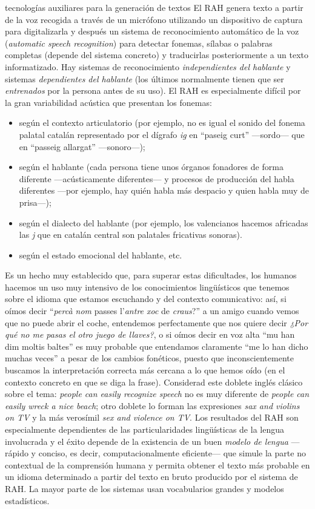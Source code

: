 \begin{persabermes}{tecnologías auxiliares para la generación de textos}
El RAH genera texto a partir de la voz recogida a través de un micrófono utilizando un dispositivo de captura para digitalizarla y después un sistema de reconocimiento automático de la voz (\emph{automatic speech recognition}) para detectar fonemas, sílabas o palabras completas (depende del sistema concreto) y traducirlas posteriormente a un texto informatizado. Hay sistemas de reconocimiento {\em independientes del hablante} y sistemas \emph{dependientes del hablante} (los últimos normalmente tienen que ser \emph{entrenados} por la persona antes de su uso). El RAH es especialmente difícil por la gran variabilidad acústica que presentan los fonemas: \begin{itemize} \item según el contexto articulatorio (por ejemplo, no es igual el sonido del fonema palatal catalán representado por el dígrafo \emph{ig} en ``paseig curt'' ---sordo--- que en ``passeig allargat'' ---sonoro---); \item según el hablante (cada persona tiene unos órganos fonadores de forma diferente ---acústicamente diferentes--- y procesos de producción del habla diferentes ---por ejemplo, hay quién habla más despacio y quien habla muy de prisa---); \item según el dialecto del hablante (por ejemplo, los valencianos hacemos africadas las \emph{j} que en catalán central son palatales fricativas sonoras). \item según el estado emocional del hablante, etc. \end{itemize} Es un hecho muy establecido que, para superar estas dificultades, los humanos hacemos un uso muy intensivo de los conocimientos lingüísticos que tenemos sobre el idioma que estamos escuchando y del contexto comunicativo: así, si oímos decir ``\emph{percà nom} passes l'\emph{antre xoc} de \emph{craus}?'' a un amigo cuando vemos que no puede abrir el coche, entendemos perfectamente que nos quiere decir \emph{¿Por qué no me pasas el otro juego de llaves?}, o si oímos decir en voz alta ``mu han dim moltis baltes'' es muy probable que entendamos claramente ``me lo han dicho muchas veces'' a pesar de los cambios fonéticos, puesto que inconscientemente buscamos la interpretación correcta más cercana a lo que hemos oído (en el contexto concreto en que se diga la frase). Considerad este doblete inglés clásico sobre el tema: \emph{people can easily recognize speech} no es muy diferente de {\em people can easily wreck a nice beach}; otro doblete lo forman las expresiones \emph{sax and violins on TV} y la más verosímil \emph{sex and violence on TV}. Los resultados del RAH son especialmente dependientes de las particularidades lingüísticas de la lengua involucrada y el éxito depende de la existencia de un buen \emph{modelo de lengua} ---rápido y conciso, es decir, computacionalmente eficiente--- que simule la parte no contextual de la comprensión humana y permita obtener el texto más probable en un idioma determinado a partir del texto en bruto producido por el sistema de RAH. La mayor parte de los sistemas usan vocabularios grandes y modelos estadísticos. 


\end{persabermes}
